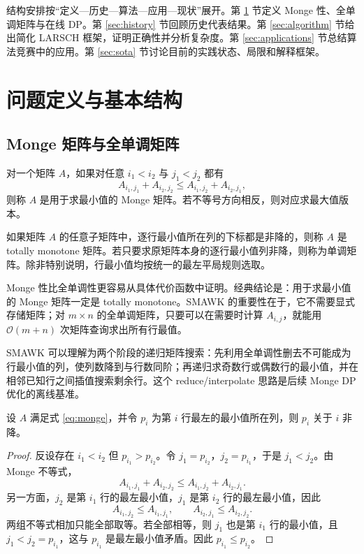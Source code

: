 \documentclass[lang=cn,a4paper,newtx,code=minted,bibtex]{elegantpaper}
\newcommand{\BigO}{\mathcal{O}}
\begin{document}
结构安排按“定义—历史—算法—应用—现状”展开。第 \ref{sec:def} 节定义 Monge 性、全单调矩阵与在线 DP。第 \ref{sec:history} 节回顾历史代表结果。第 \ref{sec:algorithm} 节给出简化 LARSCH 框架，证明正确性并分析复杂度。第 \ref{sec:applications} 节总结算法竞赛中的应用。第 \ref{sec:sota} 节讨论目前的实践状态、局限和解释框架。

\section{问题定义与基本结构}
\label{sec:def}

\subsection{Monge 矩阵与全单调矩阵}

\begin{definition}[Monge 矩阵]
对一个矩阵 $A$，如果对任意 $i_1<i_2$ 与 $j_1<j_2$ 都有
\begin{equation}
  A_{i_1,j_1}+A_{i_2,j_2}\le A_{i_1,j_2}+A_{i_2,j_1},
  \label{eq:monge}
\end{equation}
则称 $A$ 是用于求最小值的 Monge 矩阵。若不等号方向相反，则对应求最大值版本。
\end{definition}

\begin{definition}[全单调矩阵]
如果矩阵 $A$ 的任意子矩阵中，逐行最小值所在列的下标都是非降的，则称 $A$ 是 totally monotone 矩阵。若只要求原矩阵本身的逐行最小值列非降，则称为单调矩阵。除非特别说明，行最小值均按统一的最左平局规则选取。
\end{definition}

Monge 性比全单调性更容易从具体代价函数中证明。经典结论是：用于求最小值的 Monge 矩阵一定是 totally monotone。SMAWK 的重要性在于，它不需要显式存储矩阵；对 $m\times n$ 的全单调矩阵，只要可以在需要时计算 $A_{i,j}$，就能用 $\BigO(m+n)$ 次矩阵查询求出所有行最值\cite{aggarwal1987geometric}。

SMAWK 可以理解为两个阶段的递归矩阵搜索：先利用全单调性删去不可能成为行最小值的列，使列数降到与行数同阶；再递归求奇数行或偶数行的最小值，并在相邻已知行之间插值搜索剩余行。这个 reduce/interpolate 思路是后续 Monge DP 优化的离线基准。

\begin{theorem}
设 $A$ 满足式 \eqref{eq:monge}，并令 $p_i$ 为第 $i$ 行最左的最小值所在列，则 $p_i$ 关于 $i$ 非降。
\end{theorem}

\begin{proof}
反设存在 $i_1<i_2$ 但 $p_{i_1}>p_{i_2}$。令 $j_1=p_{i_2}$，$j_2=p_{i_1}$，于是 $j_1<j_2$。由 Monge 不等式，
\[
  A_{i_1,j_1}+A_{i_2,j_2}\le A_{i_1,j_2}+A_{i_2,j_1}.
\]
另一方面，$j_2$ 是第 $i_1$ 行的最左最小值，$j_1$ 是第 $i_2$ 行的最左最小值，因此
\[
  A_{i_1,j_2}\le A_{i_1,j_1},\qquad A_{i_2,j_1}\le A_{i_2,j_2}.
\]
两组不等式相加只能全部取等。若全部相等，则 $j_1$ 也是第 $i_1$ 行的最小值，且 $j_1<j_2=p_{i_1}$，这与 $p_{i_1}$ 是最左最小值矛盾。因此 $p_{i_1}\le p_{i_2}$。
\end{proof}
\end{document}
